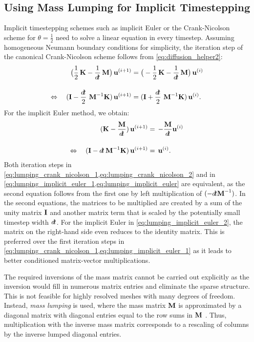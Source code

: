 \subsection{Using Mass Lumping for Implicit Timestepping}\label{sec:mass_lumping}
Implicit timestepping schemes such as implicit Euler or the Crank-Nicolson scheme for $\theta=\frac12$ need to solve a linear equation in every timestep.
Assuming homogeneous Neumann boundary conditions for simplicity, the iteration step of the canonical Crank-Nicolson scheme follows from \cref{eq:diffusion_helper2}:
\begin{subequations}\label{eq:lumping_crank_nicolson}
  \begin{align}
    \big(\dfrac1{2}\bfK-\dfrac{1}{\dt}\bfM\big)\, \bfu^{(i+1)} &= \big(-\dfrac12{\bfK} - \dfrac{1}{\dt}\bfM\big)\, \bfu^{(i)}\label{eq:lumping_crank_nicolson_1}\\[4mm]
    \Leftrightarrow \quad (\bfI - \dfrac{\dt}{2}\,\bfM^{-1}\bfK)\,\bfu^{(i+1)}&= (\bfI + \dfrac{\dt}{2}\,\bfM^{-1}\bfK)\,\bfu^{(i)}.\label{eq:lumping_crank_nicolson_2}
  \end{align}
\end{subequations}
For the implicit Euler method, we obtain:%
\begin{subequations}\label{eq:lumping_implicit_euler}
  \begin{align}
    \ds(\bfK-\frac{\bfM}{\dt})\,\bfu^{(i+1)} &=\,\ds -\frac{\bfM}{\dt}\bfu^{(i)}\label{eq:lumping_implicit_euler_1}\\[4mm]
    \Leftrightarrow \quad (\bfI - \dt\,\bfM^{-1}\bfK)\,\bfu^{(i+1)}&= \,\bfu^{(i)}.\label{eq:lumping_implicit_euler_2}
  \end{align}
\end{subequations}
Both iteration steps in \cref{eq:lumping_crank_nicolson_1,eq:lumping_crank_nicolson_2} and in \cref{eq:lumping_implicit_euler_1,eq:lumping_implicit_euler} are equivalent, as the second equation follows from the first one by left multiplication of $(-\dt \bfM^{-1})$. In the second equations, the matrices to be multiplied are created by a sum of the unity matrix $\textbf{I}$ and another matrix term that is scaled by the potentially small timestep width $\dt$. For the implicit Euler in \cref{eq:lumping_implicit_euler_2}, the matrix on the right-hand side even reduces to the identity matrix. This is preferred over the first iteration steps in \cref{eq:lumping_crank_nicolson_1,eq:lumping_implicit_euler_1} as it leads to better conditioned matrix-vector multiplications.

The required inversions of the mass matrix cannot be carried out explicitly as the inversion would fill in numerous matrix entries and eliminate the sparse structure. This is not feasible for highly resolved meshes with many degrees of freedom. Instead, \emph{mass lumping} is used, where the mass matrix $\textbf{M}$ is approximated by a diagonal matrix with diagonal entries equal to the row sums in $\textbf{M}$ \cite{Hinton1976}. Thus, multiplication with the inverse mass matrix corresponds to a rescaling of columns by the inverse lumped diagonal entries.

